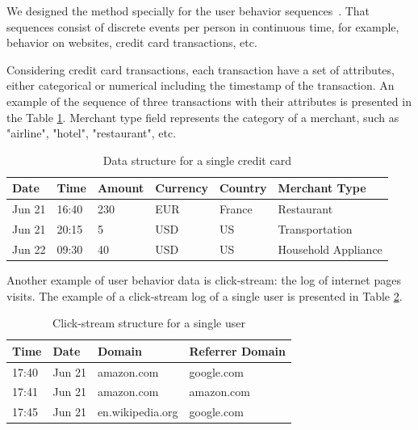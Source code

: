 \documentclass{article}
\begin{document}
We designed the method specially for the user behavior sequences~\cite{Ni2018PerceiveYU}. That sequences consist of discrete events per person in continuous time, for example,  behavior on websites, credit card transactions, etc. 

Considering credit card transactions, each transaction have a set of attributes, either categorical or numerical including the timestamp of the transaction. An example of the sequence of three transactions with their attributes is presented in the Table \ref{tab-tr-data}.
Merchant type field represents the category of a merchant, such as "airline", "hotel", "restaurant", etc.

\begin{table}
\centering
\caption{Data structure for a single credit card}
\begin{tabular}{llllll}
\toprule
\textbf{Date} & \textbf{Time} & \textbf{Amount} & \textbf{Currency} & \textbf{Country} & \textbf{Merchant Type} \\
\midrule
Jun 21 & 16:40& 230 & EUR & France & Restaurant \\
Jun 21 & 20:15 & 5 & USD & US & Transportation \\
Jun 22 & 09:30 & 40 & USD & US & Household Appliance \\
\bottomrule
\end{tabular}
\label{tab-tr-data}
\end{table}

Another example of user behavior data is click-stream: the log of internet pages  visits. The example of a click-stream log of a single user is presented in Table \ref{tab-cs-data}.

\begin{table}
\centering
\caption{Click-stream structure for a single user}
\begin{tabular}{llll}
\toprule
\textbf{Time} & \textbf{Date} & \textbf{Domain} & \textbf{Referrer Domain} \\
\midrule
17:40 & Jun 21 & amazon.com & google.com \\
17:41 & Jun 21 & amazon.com & amazon.com \\
17:45 & Jun 21 & en.wikipedia.org & google.com \\
\bottomrule
\end{tabular}
\label{tab-cs-data}
\end{table}
\end{document}
